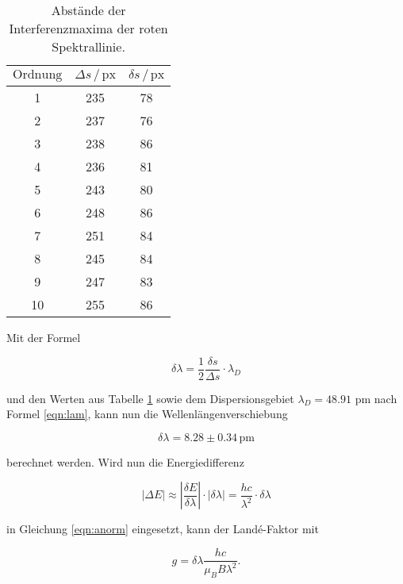 \begin{table}
    \centering
    \begin{tabular}{c c c}
    \toprule
    $\text{Ordnung}$ & $\Delta s \,/\, \text{px}$ & $\delta s \,/\, \text{px}$ \\
     \midrule 
     1 &  235 & 78 \\
     2 &  237 & 76\\
     3 &  238 & 86\\
     4 &  236 & 81\\
     5 &  243 & 80\\
     6 &  248 & 86\\
     7 &  251 & 84\\
     8 &  245 & 84\\
     9 &  247 & 83\\
     10 &  255 & 86\\
    \bottomrule
    \end{tabular}
    \caption{Abstände der Interferenzmaxima der roten Spektrallinie.}
    \label{tab:rot}
    \end{table}

\newpage
\noindent
Mit der Formel 

\begin{equation}
  \label{eqn:Wellenlaenge}
  \delta \lambda = \frac{1}{2} \frac{\delta s}{\Delta s} \cdot \lambda_D
\end{equation}

\noindent
und den Werten aus Tabelle \ref{tab:rot} sowie dem Dispersionsgebiet $\lambda_D = 48.91$ pm nach Formel \ref{eqn:lam}, kann nun die Wellenlängenverschiebung 

\begin{equation*}
    \delta \lambda = 8.28 \pm 0.34 \, \text{pm}
  \end{equation*}

\noindent
berechnet werden. Wird nun die Energiedifferenz

\begin{equation}
    |\Delta E| \approx \left | \frac{\delta E}{\delta \lambda} \right | \cdot |\delta \lambda | = \frac{h c}{\lambda^2} \cdot \delta \lambda
\end{equation}

\noindent
in Gleichung \ref{eqn:anorm} eingesetzt, kann der Landé-Faktor mit 

\begin{equation}
    \label{eqn:g}
    g = \delta \lambda \frac{hc}{\mu_B B \lambda^2}.
\end{equation}

